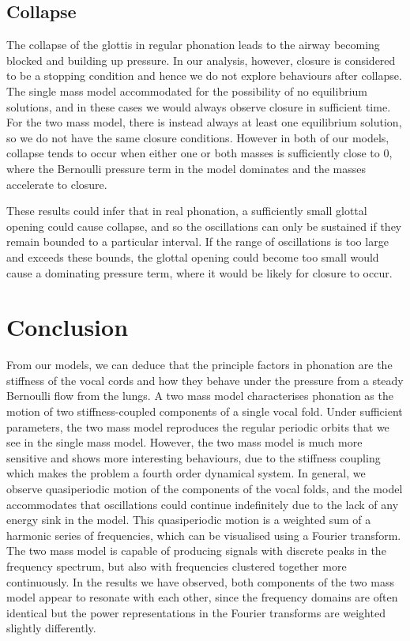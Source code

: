 \documentclass{report}
\begin{document}
\subsection{Collapse}

The collapse of the glottis in regular phonation leads to the airway becoming blocked and building up pressure.
In our analysis, however, closure is considered to be a stopping condition and hence we do not explore behaviours after collapse.
The single mass model accommodated for the possibility of no equilibrium solutions,
and in these cases we would always observe closure in sufficient time.
For the two mass model, there is instead always at least one equilibrium solution,
so we do not have the same closure conditions.
However in both of our models,
collapse tends to occur when either one or both masses is sufficiently close to $0$,
where the Bernoulli pressure term in the model dominates and the masses accelerate to closure.

These results could infer that in real phonation,
a sufficiently small glottal opening could cause collapse,
and so the oscillations can only be sustained if they remain bounded to a particular interval.
If the range of oscillations is too large and exceeds these bounds,
the glottal opening could become too small would cause a dominating pressure term,
where it would be likely for closure to occur.

\section{Conclusion}

From our models,
we can deduce that the principle factors in phonation are the stiffness of the vocal cords and how they behave under the pressure from a steady Bernoulli flow from the lungs.
A two mass model characterises phonation as the motion of two stiffness-coupled components of a single vocal fold.
Under sufficient parameters, the two mass model reproduces the regular periodic orbits that we see in the single mass model.
However, the two mass model is much more sensitive and shows more interesting behaviours,
due to the stiffness coupling which makes the problem a fourth order dynamical system.
In general, we observe quasiperiodic motion of the components of the vocal folds,
and the model accommodates that oscillations could continue indefinitely due to the lack of any energy sink in the model.
This quasiperiodic motion is a weighted sum of a harmonic series of frequencies,
which can be visualised using a Fourier transform.
The two mass model is capable of producing signals with discrete peaks in the frequency spectrum,
but also with frequencies clustered together more continuously.
In the results we have observed,
both components of the two mass model appear to resonate with each other,
since the frequency domains are often identical but the power representations in the Fourier transforms are weighted slightly differently.
\end{document}
